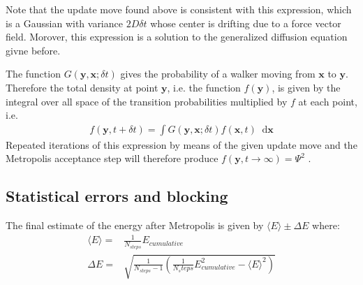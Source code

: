 \documentclass[twoside,english]{uiofysmaster}
\newcommand*\dif{\mathop{}\!\mathrm{d}}
\begin{document}
Note that the update move found above is consistent with this expression, which is a Gaussian with variance $2D \delta t$ whose center is drifting due to a force vector field. Morover, this expression is a solution to the generalized diffusion equation givne before.

The function $G(\bm{y}, \bm{x}; \delta t)$  gives the probability of a walker moving from $\bm{x}$ to $\bm{y}$. Therefore the total density at point $\bm{y}$, i.e. the function $f(\bm{y})$, is given by the integral over all space of the transition probabilities multiplied by $f$ at each point, i.e. 
\begin{align}
	f(\bm{y} , t + \delta t) = \int G(\bm{y}, \bm{x}; \delta t)  f(\bm{x}, t) \dif \bm{x}
\end{align}
Repeated iterations of this expression by means of the given update move and the Metropolis acceptance step will therefore produce 
$f (\bm{y}, t \to \infty) = \Psi^2$ .

\cite{Hammond1994}

\subsection{Statistical errors and blocking}
The final estimate of the energy after Metropolis is given by $\langle E \rangle \pm \Delta E$ where:
\begin{align}
	\langle E \rangle =& \frac{1}{N_{steps}} E_{cumulative} \\
	\Delta E =& \sqrt{ \frac{1}{N_{steps}-1} ( \frac{1}{N_steps} E_{cumulative}^2 - \langle E \rangle^2 ) }
\end{align}
\end{document}
